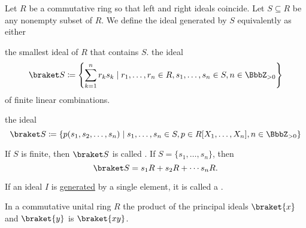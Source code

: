 \begin{definition}\label{def:generated_ring_ideal}
  Let \( R \) be a commutative ring so that left and right ideals coincide. Let \( S \subseteq R \) be any nonempty subset of \( R \). We define the ideal generated by \( S \) equivalently as either
  \begin{defenum}
     the smallest ideal of \( R \) that contains \( S \).
     the ideal
    \begin{equation*}
      \braket S \coloneqq \left\{ \sum_{k=1}^n r_k s_k \mid r_1, \ldots, r_n \in R, s_1, \ldots, s_n \in S, n \in \BbbZ_{>0} \right\}
    \end{equation*}
    of finite linear combinations.

     the ideal
    \begin{equation*}
      \braket S \coloneqq \left\{ p(s_1, s_2, \ldots, s_n) \mid s_1, \ldots, s_n \in S, p \in R[X_1, \ldots, X_n], n \in \BbbZ_{>0} \right\}
    \end{equation*}
  \end{defenum}

  If \( S \) is finite, then \( \braket S \) is called . If \( S = \{ s_1, \ldots, s_n \} \), then
  \begin{equation*}
    \braket S = s_1 R + s_2 R + \cdots s_n R.
  \end{equation*}
\end{definition}

\begin{definition}\label{def:principal_ideal}
  If an ideal \( I \) is \hyperref[def:generated_ring_ideal]{generated} by a single element, it is called a .
\end{definition}

\begin{proposition}\label{thm:product_of_principal_ideals}
  In a commutative unital ring \( R \) the product of the principal ideals \( \braket{x} \) and \( \braket{y} \) is \( \braket{xy} \).
\end{proposition}
